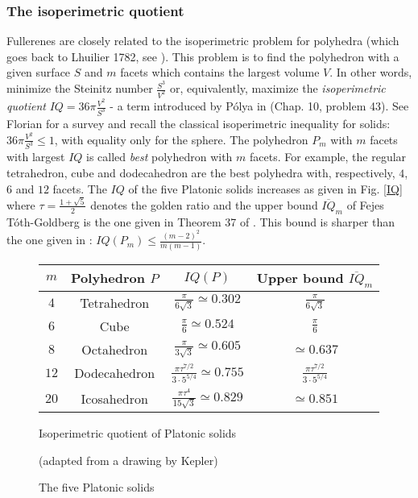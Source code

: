 \subsubsection{The isoperimetric quotient}
Fullerenes are closely related to the isoperimetric problem for polyhedra (which goes 
back to {\sc Lhuilier 1782}, see \cite{lhu}). This problem is to 
find the polyhedron with a given surface $S$ and $m$ facets
which contains the largest volume $V$. In other words, minimize the
{\sc Steinitz} number $\frac{S^3}{V^2}$ or, equivalently, 
maximize the {\it isoperimetric quotient} $IQ=36\pi\frac{V^2}{S^3}$ - a term
introduced by {\sc P\'olya } in \cite{p54}  (Chap. 10, problem 43). 
See {\sc Florian} \cite{flo93} for a survey
and recall the classical isoperimetric inequality for solids: 
$36\pi\frac{V^2}{S^3}\leq 1$, with equality only for the sphere. 
The polyhedron $P_m$ with $m$ facets with largest $IQ$ is called {\it best} polyhedron with $m$ facets.
For example, the regular tetrahedron, cube and dodecahedron are the best polyhedra with, respectively,
$4$, $6$ and $12$ facets. The $IQ$ of the five Platonic solids increases as given in Fig. \ref{IQ}
where $\tau=\frac{1+\sqrt 5}{2}$ denotes the golden ratio and the upper bound 
$\overline{IQ}_m$ of
{\sc Fejes T\'oth-Goldberg} is the one given in Theorem 37 of \cite{flo93}. This bound is sharper
than the one given in \cite{g35}: $IQ(P_m)\leq\frac{(m-2)^2}{m(m-1)}$.

\vspace{-3mm}
\begin{figure}[h]
\begin{center}
\begin{tabular}{|c|c|c|c|} \hline
$m$ & Polyhedron $P$ & $IQ(P)$ & Upper bound $\overline{IQ}_m$ \\ \hline \hline
$4$ & Tetrahedron & $\frac{\pi}{6\sqrt 3}\simeq 0.302$ & $\frac{\pi}{6\sqrt 3}$ \\ \hline
$6$ & Cube & $\frac{\pi}{6}\simeq 0.524$ & $\frac{\pi}{6}$  \\ \hline
$8$ & Octahedron & $\frac{\pi}{3\sqrt 3}\simeq 0.605$ & $\simeq 0.637$  \\ \hline
$12$ & Dodecahedron & $\frac{\pi \tau^{7/2}}{3\cdot 5^{5/4}}\simeq 0.755$ & 
$\frac{\pi\tau^{7/2}}{3\cdot 5^{5/4}}$ \\ \hline
$20$ & Icosahedron & $\frac{\pi \tau^4}{15\sqrt 3}\simeq 0.829$ & $\simeq 0.851$  \\ \hline
\end{tabular}
\caption{Isoperimetric quotient of Platonic solids}\label{IQ}
\end{center}
\begin{center}
\caption{The five Platonic solids}\label{kep}

(adapted from a drawing by {\sc Kepler})
\end{center}
\end{figure}

